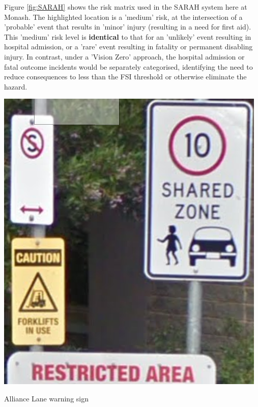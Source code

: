 \documentclass{tufte-handout}
\begin{document}
 Figure \ref{fig:SARAH} shows the risk matrix used in the SARAH system here at Monash.  The highlighted location is a 'medium' risk, at the intersection of a 'probable' event that results in 'minor' injury (resulting in a need for first aid).  This 'medium' risk level is \textbf{identical} to that for an 'unlikely' event resulting in hospital admission, or a 'rare' event resulting in fatality or permanent disabling injury. In contrast, under a 'Vision Zero' approach, the hospital admission or fatal outcome incidents would be separately categorised, identifying the need to reduce consequences to less than the FSI threshold or otherwise eliminate the hazard. 



\begin{marginfigure}
\includegraphics{Alliance_lane_forklifts}
\caption{Alliance Lane warning sign}
\label{fig:Alliance_lane_forklifts}
\end{marginfigure}
\end{document}
